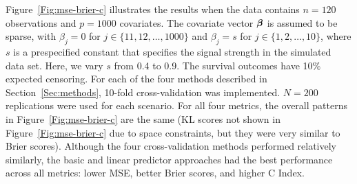 Figure~\ref{Fig:mse-brier-c} illustrates the results when the data contains $n = 120$ observations and $p = 1000$ covariates. The covariate vector $\boldsymbol{\beta}$ is assumed to be sparse, with $\beta_j = 0$ for $j \in \{11, 12, \ldots, 1000\}$ and $\beta_j = s$ for $j \in \{1, 2, \ldots, 10 \}$, where $s$ is a prespecified constant that specifies the signal strength in the simulated data set. Here, we vary $s$ from 0.4 to 0.9. The survival outcomes have 10$\%$ expected censoring. For each of the four methods described in Section~\ref{Sec:methods}, 10-fold cross-validation was implemented. $N = 200$ replications were used for each scenario.  For all four metrics, the overall patterns in Figure~\ref{Fig:mse-brier-c} are the same (KL scores not shown in Figure~\ref{Fig:mse-brier-c} due to space constraints, but they were very similar to Brier scores).  Although the four cross-validation methods performed relatively similarly, the basic and linear predictor approaches had the best performance across all metrics: lower MSE, better Brier scores, and higher C Index.

